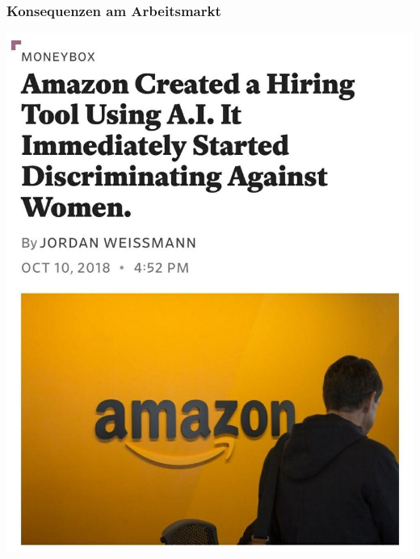 \documentclass[aspectratio=169,usenames,dvipsnames]{beamer}
\begin{document}
\begin{frame}
\frametitle{Konsequenzen am Arbeitsmarkt}
\begin{minipage}{.5\textwidth}
\begin{center}
\includegraphics[height=0.75\textheight, keepaspectratio]{images/amazon_hiring}
\end{center}
\end{minipage}\begin{minipage}{.5\textwidth}
\begin{center}

\end{center}
\end{minipage}
\end{frame}
\end{document}
